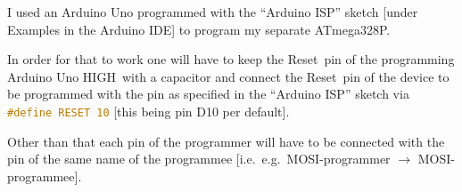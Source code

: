 \documentclass[english, parskip=half-, 11pt]{scrartcl}
\newcommand{\signalHigh}{HIGH}
\newcommand{\mosi}{MOSI}
\newcommand{\reset}{Reset}
\newcommand{\atmegathreetwoeightp}{ATmega328P}
\begin{document}
I used an Arduino Uno programmed with the \enquote{Arduino ISP} sketch [under Examples in the Arduino IDE]  to program my separate \atmegathreetwoeightp.

In order for that to work one will have to keep the \reset\ pin of the programming Arduino Uno \signalHigh\ with a capacitor and connect the \reset\ pin of the device to be programmed with the pin as specified in the \enquote{Arduino ISP} sketch via \lstinline[language=C]!#define RESET 10! [this being pin D10 per default].

Other than that each pin of the programmer will have to be connected with the pin of the same name of the programmee [i.e.\ e.g.\ \mosi -programmer $\rightarrow$ \mosi -programmee].
\end{document}
